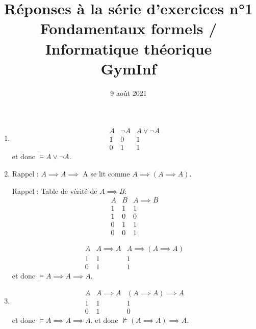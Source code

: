 \documentclass[12pt,french,a4paper]{article}
\begin{document}
\title{\vspace{-2cm}Réponses à la série d'exercices n°1\\\large{Fondamentaux formels / Informatique théorique\\GymInf}}
\date{\vspace{-1cm}9 août 2021}

\maketitle
\begin{question}
\begin{enumerate}

\item \begin{displaymath}
\begin{array}{c|ccc}
A  & \neg A & A \vee \neg A\\
\hline
1 & 0 & 1\\
0 & 1 & 1
\end{array} 
\end{displaymath}
et donc $\vDash A \vee \neg A.$

\item Rappel : $A \implies A \implies$ A se lit comme $A \implies (A \implies A).$

Rappel : Table de vérité de $A \implies B$:
\begin{displaymath}
\begin{array}{cc|c}
A & B & A \implies B\\
\hline
1 & 1 & 1\\
1 & 0 & 0\\
0 & 1 & 1\\
0 & 0 & 1
\end{array}
\end{displaymath}

\begin{displaymath}
\begin{array}{c|ccc}
A  & A \implies A & A \implies (A \implies A)\\
\hline
1 & 1 & 1\\
0 & 1 & 1
\end{array} 
\end{displaymath}
et donc $\vDash A \implies A \implies A.$

\item \begin{displaymath}
\begin{array}{c|ccc}
A  & A \implies A & (A \implies A) \implies A\\
\hline
1 & 1 & 1\\
0 & 1 & 0
\end{array} 
\end{displaymath}
et donc $\vDash A \implies A \implies A.$
et donc $\not\vDash (A \implies A) \implies A.$


\end{enumerate}
\end{question}
\end{document}
